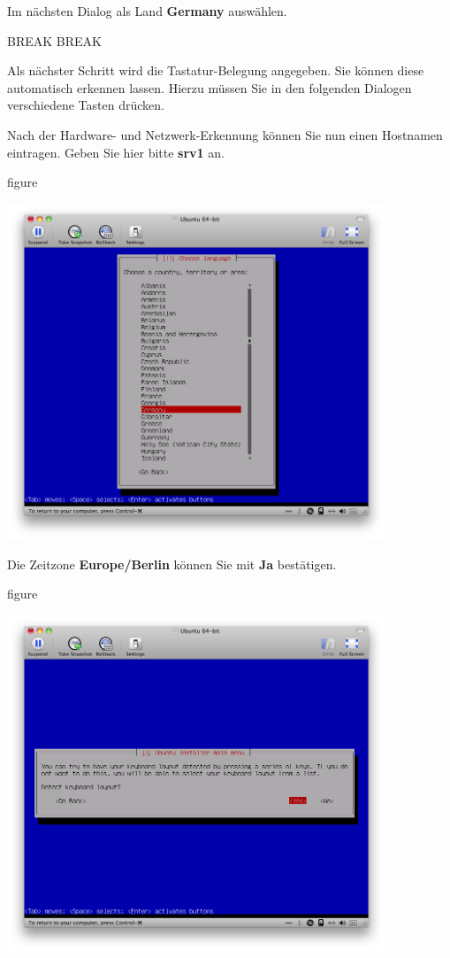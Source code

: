 Im nächsten Dialog als Land \textbf{Germany} auswählen.


BREAK BREAK

Als nächster Schritt wird die Tastatur-Belegung angegeben. Sie können diese automatisch erkennen lassen. Hierzu müssen Sie in
den folgenden Dialogen verschiedene Tasten drücken.

Nach der Hardware- und Netzwerk-Erkennung können Sie nun einen Hostnamen eintragen. Geben Sie hier bitte \textbf{srv1} an.

\begin{nofloat}{figure}
\begin{center}
\includegraphics[width=0.85\textwidth]{screenshots/05_ubuntu_install.png}
\end{center}
\end{nofloat}

\pagebreak
Die Zeitzone \textbf{Europe/Berlin} können Sie mit \textbf{Ja} bestätigen.

\begin{nofloat}{figure}
\begin{center}
\includegraphics[width=0.85\textwidth]{screenshots/06_ubuntu_install.png}
\end{center}
\end{nofloat}

